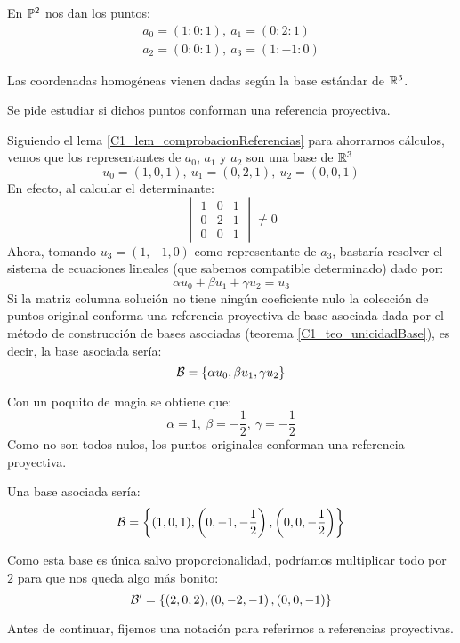 \begin{exa}
	\label{C1_exa_basesAsociadas}
	En $\mathbb{P}^2$ nos dan los puntos: \begin{gather*}a_0=(1:0:1),\ a_1=(0:2:1)\\a_2=(0:0:1),\ a_3=(1:-1:0)
	\end{gather*}
	
	Las coordenadas homogéneas vienen dadas según la base estándar de $\mathbb{R}^3$.
	
	Se pide estudiar si dichos puntos conforman una referencia proyectiva.
	
	Siguiendo el lema \ref{C1_lem_comprobacionReferencias} para ahorrarnos cálculos, vemos que los representantes de $a_0$, $a_1$ y $a_2$ son una base de $\mathbb{R}^3$
		\begin{equation*}
		u_0=(1,0,1),\ u_1=(0,2,1),\ u_2=(0,0,1)
		\end{equation*}
	En efecto, al calcular el determinante:
	\[\begin{vmatrix}
	1 & 0 & 1\\
	0 & 2 & 1\\
	0 & 0 & 1
	\end{vmatrix}\not= 0\]
	Ahora, tomando $u_3=(1,-1,0)$ como representante de $a_3$, bastaría resolver el sistema de ecuaciones lineales (que sabemos compatible determinado) dado por:
	\[\alpha u_0+\beta u_1 + \gamma u_2 = u_3\]
	Si la matriz columna solución no tiene ningún coeficiente nulo la colección de puntos original conforma una referencia proyectiva de base asociada dada por el método de construcción de bases asociadas (teorema \ref{C1_teo_unicidadBase}), es decir, la base asociada sería:\[\mathcal{B}=\{\alpha u_0,\beta u_1, \gamma u_2\}\]
	
	Con un poquito de magia se obtiene que:\[\alpha = 1,\ \beta = -\frac{1}{2},\ \gamma = -\frac{1}{2}\]
	Como no son todos nulos, los puntos originales conforman una referencia proyectiva.
	
	Una base asociada sería:
	\[
	\mathcal{B}=\left\{(1,0,1), \left(0,-1,-\frac{1}{2}\right),\left(0,0,-\frac{1}{2}\right)\right\}
	\]
	
	Como esta base es única salvo proporcionalidad, podríamos multiplicar todo por $2$ para que nos queda algo más bonito:
	\[
	\mathcal{B}'=\left\{(2,0,2), \left(0,-2,-1\right),\left(0,0,-1\right)\right\}
	\]
\end{exa}
Antes de continuar, fijemos una notación para referirnos a referencias proyectivas.


